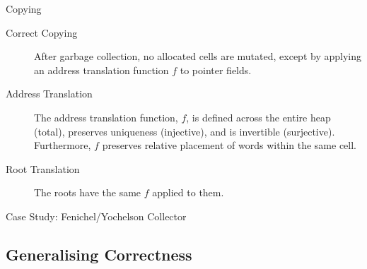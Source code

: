 \documentclass[usenames,dvipsnames]{beamer}
\begin{document}
\begin{frame}{Copying}
  \begin{description}
  \item[Correct Copying] After garbage collection, no allocated cells
    are mutated, except by applying an address translation function
    $f$ to pointer fields.

  \item[Address Translation] The address translation function, $f$, is
    defined across the entire heap (total), preserves uniqueness
    (injective), and is invertible (surjective). Furthermore, $f$
    preserves relative placement of words within the same cell.

  \item[Root Translation] The roots have the same $f$ applied to them.
  \end{description}

  Case Study: Fenichel/Yochelson Collector

\end{frame}

\subsection{Generalising Correctness}
\end{document}
